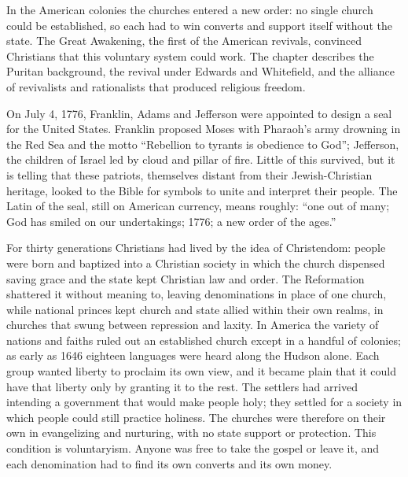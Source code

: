 
\begin{inbrief}
In the American colonies the churches entered a new order: no single church could be established, so
each had to win converts and support itself without the state. The Great Awakening, the first of the
American revivals, convinced Christians that this voluntary system could work. The chapter describes
the Puritan background, the revival under Edwards and Whitefield, and the alliance of revivalists and
rationalists that produced religious freedom.
\end{inbrief}

On July 4, 1776, Franklin, Adams and Jefferson were appointed to design a seal for the United States.
Franklin proposed Moses with Pharaoh's army drowning in the Red Sea and the motto ``Rebellion to
tyrants is obedience to God''; Jefferson, the children of Israel led by cloud and pillar of fire.
Little of this survived, but it is telling that these patriots, themselves distant from their
Jewish-Christian heritage, looked to the Bible for symbols to unite and interpret their people. The
Latin of the seal, still on American currency, means roughly: ``one out of many; God has smiled on
our undertakings; 1776; a new order of the ages.''

For thirty generations Christians had lived by the idea of Christendom: people were born and baptized
into a Christian society in which the church dispensed saving grace and the state kept Christian law
and order. The Reformation shattered it without meaning to, leaving denominations in place of one
church, while national princes kept church and state allied within their own realms, in
churches that swung between repression and laxity. In America the variety of nations and faiths ruled out an established church except in a handful of colonies; as early as 1646 eighteen languages were heard
along the Hudson alone. Each group wanted liberty to proclaim its own view, and it became plain that
it could have that liberty only by granting it to the rest. The settlers had arrived intending a government that would make people holy; they settled for a society in which people could still
practice holiness. The churches were therefore on their own in evangelizing and nurturing, with no
state support or protection. This condition is voluntaryism. Anyone was free to take the gospel or leave it, and each denomination had to find its own converts and its own money.

